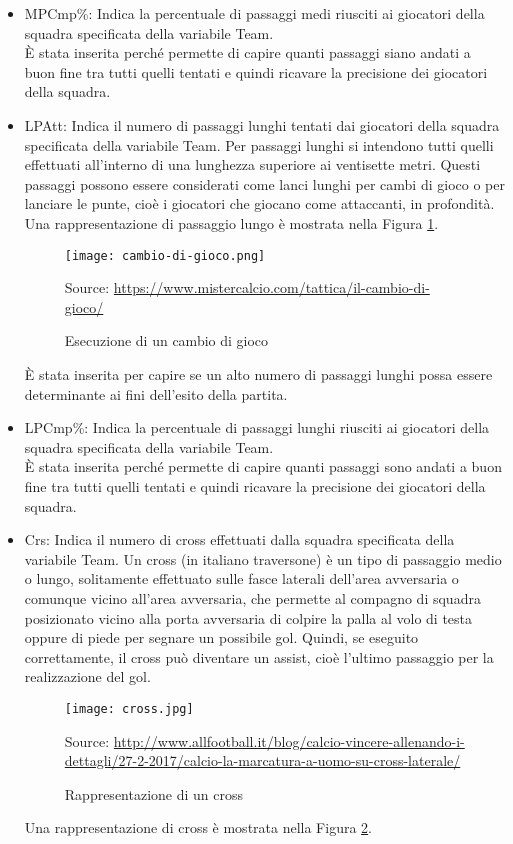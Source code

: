 \begin{itemize}
	\item \textsf{MPCmp\%}: Indica la percentuale di passaggi medi riusciti ai giocatori della squadra specificata della variabile \textsf{Team}.\\ 
	È stata inserita perché permette di capire quanti passaggi siano andati a buon fine tra tutti quelli tentati e quindi ricavare la precisione dei giocatori della squadra.
	\item \textsf{LPAtt}: Indica il numero di passaggi lunghi tentati dai giocatori della squadra specificata della variabile \textsf{Team}. Per passaggi lunghi si intendono tutti quelli effettuati all'interno di una lunghezza superiore ai ventisette metri. Questi passaggi possono essere considerati come lanci lunghi per cambi di gioco o per lanciare le punte, cioè i giocatori che giocano come attaccanti, in profondità. Una rappresentazione di passaggio lungo è mostrata nella Figura \ref{fig:cambio}.\\
	\begin{figure}[ht]
		\begin{center}
			\texttt{[image: cambio-di-gioco.png]}
			\caption{Esecuzione di un cambio di gioco} \label{fig:cambio}
			Source: \url{https://www.mistercalcio.com/tattica/il-cambio-di-gioco/}
		\end{center}
	\end{figure}
	È stata inserita per capire se un alto numero di passaggi lunghi possa essere determinante ai fini dell'esito della partita.
	
	\item \textsf{LPCmp\%}: Indica la percentuale di passaggi lunghi riusciti ai giocatori della squadra specificata della variabile \textsf{Team}. \\
	È stata inserita perché permette di capire quanti passaggi sono andati a buon fine tra tutti quelli tentati e quindi ricavare la precisione dei giocatori della squadra.
	
	\item \textsf{Crs}: Indica il numero di cross effettuati dalla squadra specificata della variabile \textsf{Team}. Un cross (in italiano traversone) è un tipo di passaggio medio o lungo, solitamente effettuato sulle fasce laterali dell'area avversaria o comunque vicino all'area avversaria, che permette al compagno di squadra posizionato vicino alla porta avversaria di colpire la palla al volo di testa oppure di piede per segnare un possibile gol. Quindi, se eseguito correttamente, il cross può diventare un assist, cioè l'ultimo passaggio per la realizzazione del gol. 
	
	\begin{figure}[!ht]
		\begin{center}
			\texttt{[image: cross.jpg]}
			\caption{Rappresentazione di un cross} \label{fig:cross}
			Source: \url{http://www.allfootball.it/blog/calcio-vincere-allenando-i-dettagli/27-2-2017/calcio-la-marcatura-a-uomo-su-cross-laterale/}
		\end{center}
	\end{figure}
	
	Una rappresentazione di cross è mostrata nella Figura \ref{fig:cross}.
\end{itemize}

